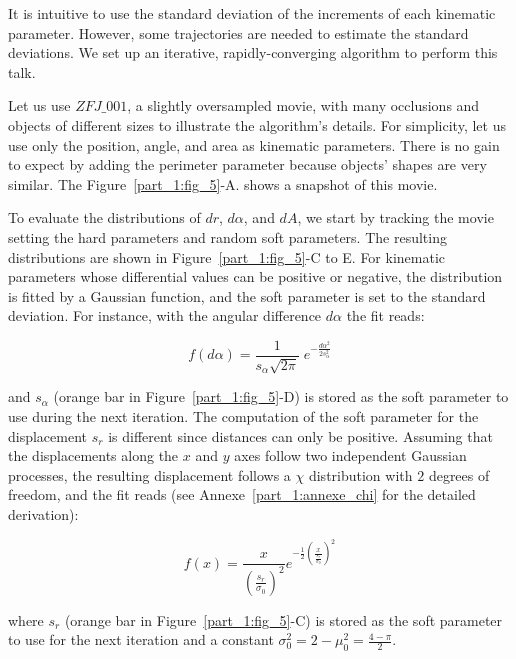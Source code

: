     It is intuitive to use the standard deviation of the increments of each kinematic parameter. However, some trajectories are needed to estimate the standard deviations. We set up an iterative, rapidly-converging algorithm to perform this talk.

    Let us use $ZFJ\_001$, a slightly oversampled movie, with many occlusions and objects of different sizes to illustrate the algorithm's details. For simplicity, let us use only the position, angle, and area as kinematic parameters. There is no gain to expect by adding the perimeter parameter because objects' shapes are very similar. The Figure~\ref{part_1:fig_5}-A. shows a snapshot of this movie.

    To evaluate the distributions of $dr$, $d\alpha$, and $dA$, we start by tracking the movie setting the hard parameters and random soft parameters. The resulting distributions are shown in Figure~\ref{part_1:fig_5}-C to E. For kinematic parameters whose differential values can be positive or negative, the distribution is fitted by a Gaussian function, and the soft parameter is set to the standard deviation. For instance, with the angular difference $d\alpha$ the fit reads:

    \begin{equation}
    f(d\alpha) = \frac{1}{s_\alpha\sqrt{2 \pi}} \; e^{-\frac{d\alpha^2}{2 s_\alpha^2}}
    \label{eq:fit_Gaussian}
    \end{equation}

    \noindent and $s_\alpha$ (orange bar in Figure~\ref{part_1:fig_5}-D) is stored as the soft parameter to use during the next iteration.
    The computation of the soft parameter for the displacement $s_r$ is different since distances can only be positive. Assuming that the displacements along the $x$ and $y$ axes follow two independent Gaussian processes, the resulting displacement follows a $\chi$ distribution with $2$ degrees of freedom, and the fit reads (see Annexe~\ref{part_1:annexe_chi} for the detailed derivation):

    \begin{equation}
        f(x)=\frac{x}{(\frac{s_{r}}{\sigma_0})^2}e^{-\frac{1}{2}(\frac{x}{\frac{s_{r}}{\sigma_0}})^2}
        \label{eq1}
    \end{equation}

    \noindent where $s_r$ (orange bar in Figure~\ref{part_1:fig_5}-C) is stored as the soft parameter to use for the next iteration and a constant $\sigma_0^2=2-\mu_0^2=\frac{4-\pi}{2}$.

